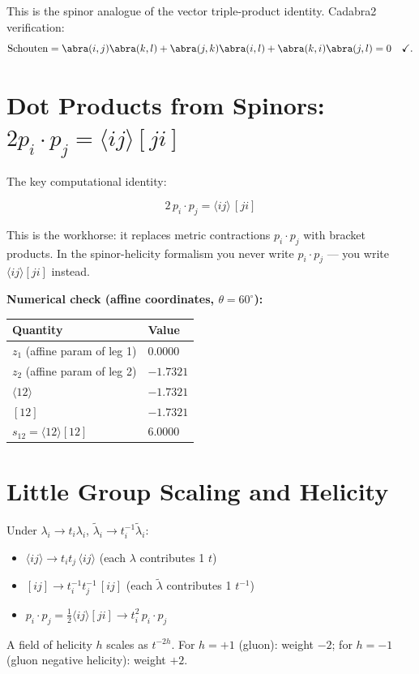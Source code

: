 \documentclass[12pt]{article}
\begin{document}
This is the spinor analogue of the vector triple-product identity.
Cadabra2 verification:
\begin{equation}
\mathrm{Schouten} = \abra(i , j) \abra(k , l) + \abra(j , k) \abra(i , l) + \abra(k , i) \abra(j , l) = 0 \quad\checkmark .
\end{equation}

\section{Dot Products from Spinors:
$2p_i\cdot p_j = \langle ij\rangle[ji]$}\label{sec:dot_products}

The key computational identity:

\begin{mdframed}[backgroundcolor=green!5]
\begin{equation}
\boxed{2\,p_i\cdot p_j = \langle ij\rangle\,[ji]}
\tag{42.17}
\end{equation}
\end{mdframed}

This is the workhorse: it replaces metric contractions $p_i\cdot p_j$ with
bracket products.  In the spinor-helicity formalism you never write
$p_i\cdot p_j$ --- you write $\langle ij\rangle[ji]$ instead.

\textbf{Numerical check (affine coordinates, $\theta=60^\circ$):}
\begin{center}
\begin{tabular}{|l|l|}
\hline
Quantity & Value \\
\hline
$z_1$ (affine param of leg 1) & $0.0000$ \\
$z_2$ (affine param of leg 2) & $-1.7321$ \\
$\langle 12\rangle$ & $-1.7321$ \\
$[12]$ & $-1.7321$ \\
$s_{12}=\langle12\rangle[12]$ & $6.0000$ \\
\hline
\end{tabular}
\end{center}

\section{Little Group Scaling and Helicity}\label{sec:helicity}

Under $\lambda_i\to t_i\lambda_i$, $\tilde\lambda_i\to t_i^{-1}\tilde\lambda_i$:
\begin{itemize}
\item $\langle ij\rangle\to t_i t_j\,\langle ij\rangle$ (each $\lambda$ contributes 1 $t$)
\item $[ij]\to t_i^{-1}t_j^{-1}\,[ij]$ (each $\tilde\lambda$ contributes 1 $t^{-1}$)
\item $p_i\cdot p_j = \tfrac12\langle ij\rangle[ji]\to t_i^2\,p_i\cdot p_j$
\end{itemize}
A field of helicity $h$ scales as $t^{-2h}$.  For $h=+1$ (gluon): weight $-2$;
for $h=-1$ (gluon negative helicity): weight $+2$.
\end{document}
